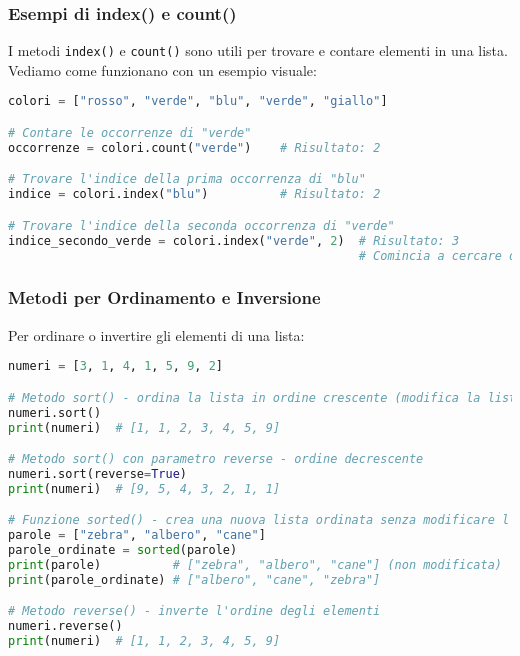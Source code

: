 \subsubsection{Esempi di index() e count()}\label{EsempiInputCountListe}

I metodi \texttt{index()} e \texttt{count()} sono utili per trovare e contare elementi in una lista. Vediamo come funzionano con un esempio visuale:

\begin{lstlisting}[language=Python]
colori = ["rosso", "verde", "blu", "verde", "giallo"]

# Contare le occorrenze di "verde"
occorrenze = colori.count("verde")    # Risultato: 2

# Trovare l'indice della prima occorrenza di "blu"
indice = colori.index("blu")          # Risultato: 2

# Trovare l'indice della seconda occorrenza di "verde"
indice_secondo_verde = colori.index("verde", 2)  # Risultato: 3
                                                 # Comincia a cercare dall'indice 2
\end{lstlisting}





\subsubsection{Metodi per Ordinamento e Inversione}\label{MetodiOrdinamentoInversioneListe}

Per ordinare o invertire gli elementi di una lista:

\begin{lstlisting}[language=Python]
numeri = [3, 1, 4, 1, 5, 9, 2]

# Metodo sort() - ordina la lista in ordine crescente (modifica la lista originale)
numeri.sort()
print(numeri)  # [1, 1, 2, 3, 4, 5, 9]

# Metodo sort() con parametro reverse - ordine decrescente
numeri.sort(reverse=True)
print(numeri)  # [9, 5, 4, 3, 2, 1, 1]

# Funzione sorted() - crea una nuova lista ordinata senza modificare l'originale
parole = ["zebra", "albero", "cane"]
parole_ordinate = sorted(parole)
print(parole)          # ["zebra", "albero", "cane"] (non modificata)
print(parole_ordinate) # ["albero", "cane", "zebra"]

# Metodo reverse() - inverte l'ordine degli elementi
numeri.reverse()
print(numeri)  # [1, 1, 2, 3, 4, 5, 9]
\end{lstlisting}

